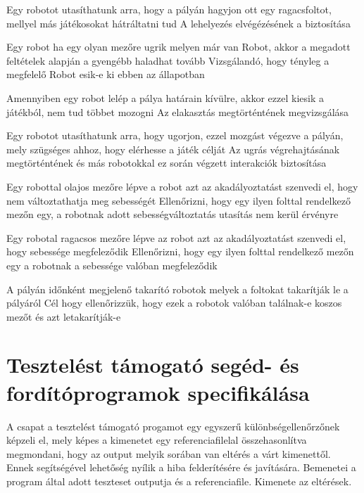 %
{Egy robotot utasíthatunk arra, hogy a pályán hagyjon ott egy ragacsfoltot, mellyel más játékosokat hátráltatni tud}%
{A lehelyezés elvégézésének a biztosítása}

%
{Egy robot ha egy olyan mezőre ugrik melyen már van Robot, akkor a megadott feltételek alapján a gyengébb haladhat tovább}%
{Vizsgálandó, hogy tényleg a megfelelő Robot esik-e ki ebben az állapotban}

%
{Amennyiben egy robot lelép a pálya határain kívülre, akkor ezzel kiesik a játékból, nem tud többet mozogni}%
{Az elakasztás megtörténtének megvizsgálása}

%
{Egy robotot utasíthatunk arra, hogy ugorjon, ezzel mozgást végezve a pályán, mely szügséges ahhoz, hogy elérhesse a játék célját}%
{Az ugrás végrehajtásának megtörténtének és más robotokkal ez során végzett interakciók biztosítása}

%
{Egy robottal olajos mezőre lépve a robot azt az akadályoztatást szenvedi el, hogy nem változtathatja meg sebességét}%
{Ellenőrizni, hogy egy ilyen folttal rendelkező mezőn egy, a robotnak adott sebességváltoztatás utasítás nem kerül érvényre}

%
{Egy robotal ragacsos mezőre lépve az robot azt az akadályoztatást szenvedi el, hogy sebessége megfeleződik}%
{Ellenőrizni, hogy egy ilyen folttal rendelkező mezőn egy a robotnak a sebessége valóban megfeleződik}

%
{A pályán időnként megjelenő takarító robotok melyek a foltokat takarítják le a pályáról}%
{Cél hogy ellenőrizzük, hogy ezek a robotok valóban találnak-e koszos mezőt és azt letakarítják-e}

\section{Tesztelést támogató segéd- és fordítóprogramok specifikálása}
A csapat a tesztelést támogató progamot egy egyszerű különbségellenőrzőnek képzeli el, mely képes a kimenetet egy referenciafilelal összehasonlítva megmondani,
hogy az output melyik sorában van eltérés a várt kimenettől. Ennek segítségével lehetőség nyílik a hiba felderítésére és javítására. Bemenetei a program által adott
teszteset outputja és a referenciafile. Kimenete az eltérések. 

